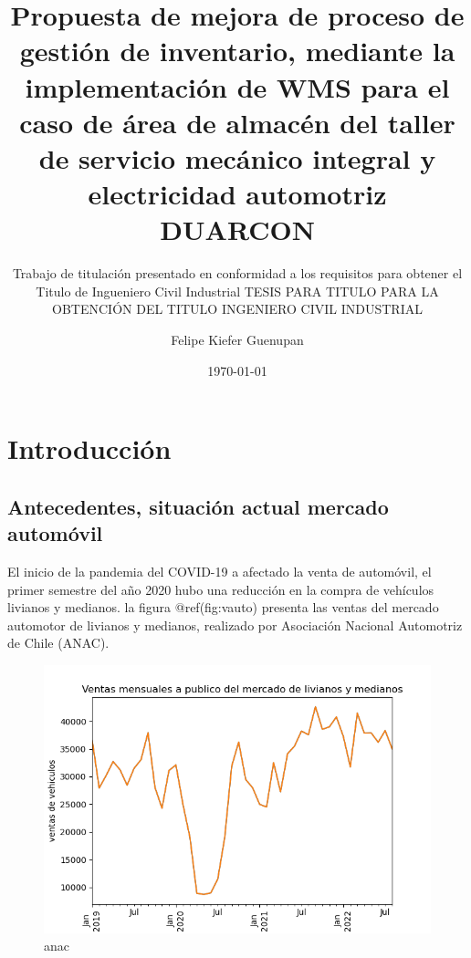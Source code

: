 \documentclass[
]{article}
\title{Propuesta de mejora de proceso de gestión de inventario, mediante
la implementación de WMS para el caso de área de almacén del taller de
servicio mecánico integral y electricidad automotriz DUARCON}
\subtitle{Trabajo de titulación presentado en conformidad a los
requisitos para obtener el Titulo de Ingueniero Civil Industrial TESIS
PARA TITULO PARA LA OBTENCIÓN DEL TITULO INGENIERO CIVIL INDUSTRIAL}
\author{Felipe Kiefer Guenupan}
\date{\today}
\begin{document}
\maketitle

\newpage

\newpage

\hypertarget{introducciuxf3n}{%
\section{Introducción}\label{introducciuxf3n}}

\hypertarget{antecedentes-situaciuxf3n-actual-mercado-automuxf3vil}{%
\subsection{Antecedentes, situación actual mercado
automóvil}\label{antecedentes-situaciuxf3n-actual-mercado-automuxf3vil}}

El inicio de la pandemia del COVID-19 a afectado la venta de automóvil,
el primer semestre del año 2020 hubo una reducción en la compra de
vehículos livianos y medianos. la figura @ref(fig:vauto) presenta las
ventas del mercado automotor de livianos y medianos, realizado por
Asociación Nacional Automotriz de Chile (ANAC).

\begin{figure}
\centering
\includegraphics{fig/anac.png}
\caption{anac}
\end{figure}
\end{document}
